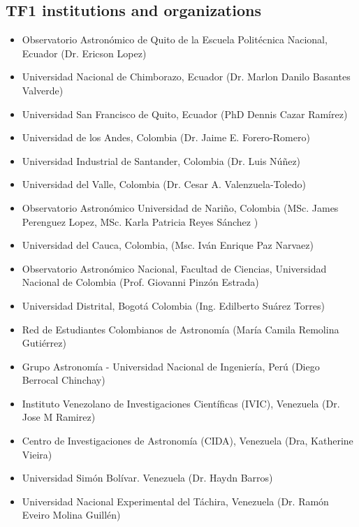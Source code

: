 \documentclass[12pt]{article}
\begin{document}
\subsection*{TF1 institutions and organizations}
\begin{itemize}
\item Observatorio Astronómico de Quito de la Escuela Politécnica
  Nacional, Ecuador (Dr. Ericson Lopez) 
\item Universidad Nacional de Chimborazo, Ecuador (Dr. Marlon Danilo
  Basantes Valverde) 
\item Universidad San Francisco de Quito, Ecuador (PhD Dennis Cazar
  Ramírez) 
\item Universidad de los Andes, Colombia (Dr. Jaime E. Forero-Romero) 
\item Universidad Industrial de Santander, Colombia (Dr. Luis Núñez)
\item Universidad del Valle, Colombia (Dr. Cesar A. Valenzuela-Toledo)
\item Observatorio Astronómico Universidad de Nariño, Colombia
  (MSc. James Perenguez Lopez, MSc. Karla Patricia Reyes Sánchez ) 
\item Universidad del Cauca, Colombia, (Msc. Iván Enrique Paz Narvaez) 
\item Observatorio Astronómico Nacional, Facultad de Ciencias,
  Universidad Nacional de Colombia (Prof. Giovanni Pinzón Estrada) 
\item Universidad Distrital, Bogotá Colombia (Ing. Edilberto Suárez
  Torres) 
\item Red de Estudiantes Colombianos de Astronom\'ia (Mar\'ia Camila
  Remolina Guti\'errez) 
\item Grupo Astronomía - Universidad Nacional de Ingeniería, Perú
  (Diego Berrocal Chinchay) 
\item Instituto Venezolano de Investigaciones Científicas (IVIC),
  Venezuela (Dr. Jose M Ramirez) 
\item Centro de Investigaciones de Astronomía (CIDA), Venezuela (Dra,
  Katherine Vieira) 
\item Universidad Simón Bolívar. Venezuela (Dr. Haydn Barros) 
\item Universidad Nacional Experimental del Táchira, Venezuela
  (Dr. Ramón Eveiro Molina Guillén) 
\end{itemize}
\end{document}
